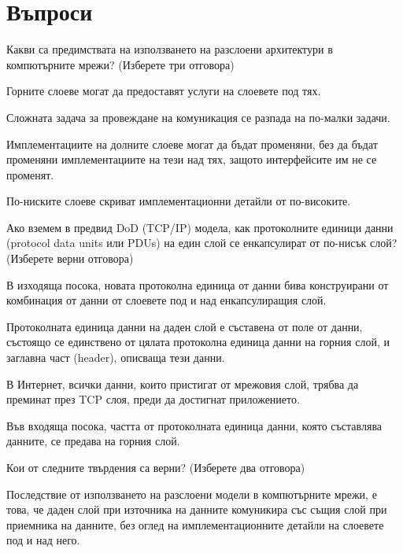 \section*{Въпроси}

\begin{questions}

  \question[6] Какви са предимствата на използването на разслоени архитектури в
  компютърните мрежи? (Изберете три отговора)

  \begin{choices}
    \choice Горните слоеве могат да предоставят услуги на слоевете под тях.

    \CorrectChoice Сложната задача за провеждане на комуникация се разпада на
    по-малки задачи.

    \CorrectChoice Имплементациите на долните слоеве могат да бъдат променяни, без
    да бъдат променяни имплементациите на тези над тях, защото интерфейсите им не
    се променят.

    \CorrectChoice По-ниските слоеве скриват имплементационни детайли от
    по-високите.
  \end{choices}\question[6] Ако вземем в предвид \foreignlanguage{english}{DoD (TCP/IP)}
  модела, как протоколните единици данни (\foreignlanguage{english}{protocol data
    units} или \foreignlanguage{english}{PDUs}) на един слой се енкапсулират от
  по-нисък слой? (Изберете верни отговора)

  \begin{choices}
    \choice В изходяща посока, новата протоколна единица от данни бива
    конструирани от комбинация от данни от слоевете под и над енкапсулиращия слой.

    \CorrectChoice Протоколната единица данни на даден слой е съставена от поле от
    данни, състоящо се единствено от цялата протоколна единица данни на горния
    слой, и заглавна част (\foreignlanguage{english}{header}), описваща тези
    данни.

    \choice В Интернет, всички данни, които пристигат от мрежовия слой, трябва да
    преминат през TCP слоя, преди да достигнат приложението.

    \CorrectChoice Във входяща посока, частта от протоколната единица данни, която
    съставлява данните, се предава на горния слой.
  \end{choices}\question[6] Кои от следните твърдения са верни? (Изберете два отговора)

  \begin{choices}
    \CorrectChoice Последствие от използването на разслоени модели в компютърните
    мрежи, е това, че даден слой при източника на данните комуникира със същия
    слой при приемника на данните, без оглед на имплементационните детайли на
    слоевете под и над него.


\end{choices}
\end{questions}
